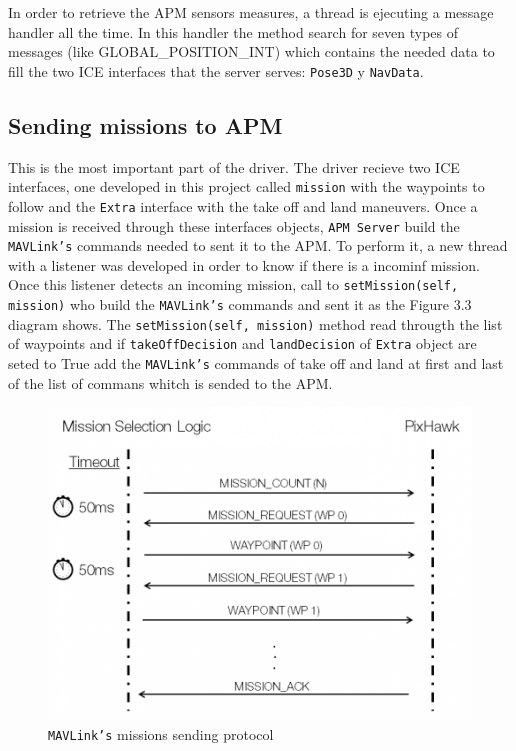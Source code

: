 In order to retrieve the APM sensors measures, a thread is ejecuting a message handler all the time.
In this handler the method search for seven types of messages (like GLOBAL\_POSITION\_INT) which contains the needed data to fill the two ICE interfaces that the server serves: \texttt{Pose3D} y \texttt{NavData}.


\subsection{Sending missions to APM}
\label{sec:mission_apm}

This is the most important part of the driver. The driver recieve two ICE interfaces, one developed in this project called \texttt{mission} with the waypoints to follow and the \texttt{Extra} interface with the take off and land maneuvers.
Once a mission is received through these interfaces objects, \texttt{APM Server} build the \texttt{MAVLink's} commands needed to sent it to the APM. To perform it, a new thread with a listener was developed in order to know if there is a incominf mission.
Once this listener detects an incoming mission, call to \texttt{setMission(self, mission)} who build the \texttt{MAVLink's} commands and sent it as the Figure 3.3 diagram shows.
The \texttt{setMission(self, mission)} method read througth the list of waypoints and if \texttt{takeOffDecision} and \texttt{landDecision} of \texttt{Extra} object are seted to True add the \texttt{MAVLink's} commands of take off and land at first and last of the list of commans whitch is sended to the APM.
 

\begin{figure}[H]
  \centering
  \includegraphics[scale=0.70]{img/waypoint-protocol-sendlist.png}
  \caption{\texttt{MAVLink's} missions sending protocol}
  \label{fig:misiones_mavlink}
\end{figure}


